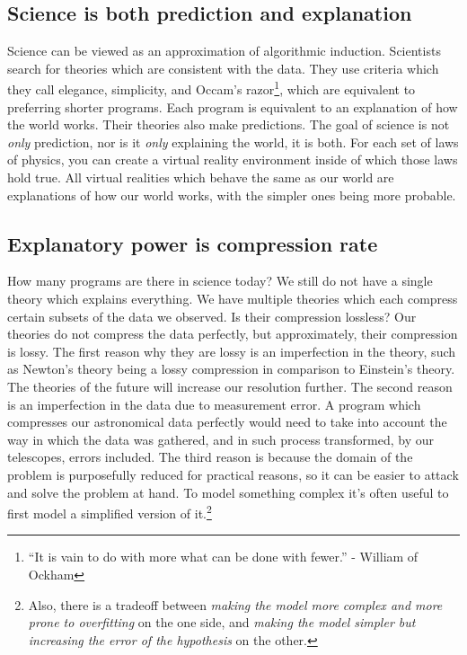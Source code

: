 \subsection{Science is both prediction and explanation}

Science can be viewed as an approximation of algorithmic induction.
Scientists search for theories which are consistent with the data.
They use criteria which they call elegance, simplicity, and Occam's razor\footnote{“It is vain to do with more what can be done with fewer.” - William of Ockham}, which are equivalent to preferring shorter programs.
Each program is equivalent to an explanation of how the world works.
Their theories also make predictions.
The goal of science is not \textit{only} prediction, nor is it \textit{only} explaining the world, it is both.
For each set of laws of physics, you can create a virtual reality environment inside of which those laws hold true.
All virtual realities which behave the same as our world are explanations of how our world works, with the simpler ones being more probable.

\newpage

\subsection{Explanatory power is compression rate}

How many programs are there in science today?
We still do not have a single theory which explains everything.
We have multiple theories which each compress certain subsets of the data we observed.
Is their compression lossless?
Our theories do not compress the data perfectly, but approximately, their compression is lossy.
The first reason why they are lossy is an imperfection in the theory, such as Newton's theory being a lossy compression in comparison to Einstein's theory.
The theories of the future will increase our resolution further.
The second reason is an imperfection in the data due to measurement error.
A program which compresses our astronomical data perfectly would need to take into account the way in which the data was gathered, and in such process transformed, by our telescopes, errors included.
The third reason is because the domain of the problem is purposefully reduced for practical reasons, so it can be easier to attack and solve the problem at hand.
To model something complex it's often useful to first model a simplified version of it.\footnote{Also, there is a tradeoff between \textit{making the model more complex and more prone to overfitting} on the one side, and \textit{making the model simpler but increasing the error of the hypothesis} on the other.}

